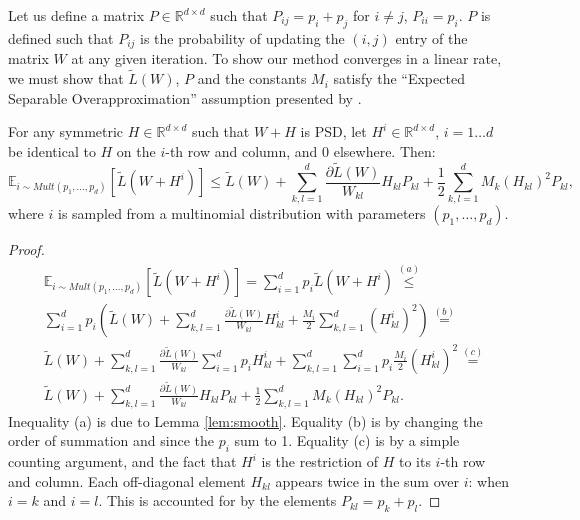 \documentclass[twoside,11pt]{article}
\newcommand\mat[1]{{#1}}
\newcommand{\W}{\mat{W}}
\newcommand{\Hh}{\mat{H}}
\newcommand{\Pp}{\mat{P}}
\newcommand{\R}{\mathbb{R}}
\newcommand{\tL}{\tilde{L}(\W)}
\newcommand{\grdkl}{\frac{\partial \tL}{\W_{kl}}}
\begin{document}
Let us define a matrix $\Pp \in \R^{d \times d}$ such that $\Pp_{ij} = p_i + p_j$ for $i \ne j$, $\Pp_{ii} = p_i$. $\Pp$ is defined such that $\Pp_{ij}$ is the probability of updating the $(i,j)$ entry of the matrix $\W$ at any given iteration. To show our method converges in a linear rate, we must show that $\tL$, $\Pp$ and the constants $M_i$ satisfy the ``Expected Separable Overapproximation'' assumption presented by \citet{richtarik2013optimal}.

\begin{lemma}\label{lem:ESO}
For any symmetric $\Hh \in \R^{d \times d}$ such that $\W + \Hh$ is PSD, let $\Hh^i \in \R^{d \times d}$, $i=1 \ldots d$ be identical to $\Hh$ on the $i$-th row and column, and $0$ elsewhere. Then:
\vspace{-15pt}
\begin{equation}
    \mathbb{E}_{i \sim Mult(p_1, \ldots, p_d)} \left[ \tilde{L}(\W + \Hh^i) \right] \leq 
    \tL + \sum_{k,l=1}^d  \grdkl \Hh_{kl} \Pp_{kl} + \frac{1}{2} \sum_{k,l=1}^d   M_k (\Hh_{kl})^2 \Pp_{kl},
\end{equation}
where $i$ is sampled from a multinomial distribution with parameters $(p_1, \ldots , p_d)$.
\end{lemma}
\begin{proof}%
\vspace{-20pt}
\begin{align*}
    &\mathbb{E}_{i \sim Mult(p_1, \ldots, p_d)} \left[ \tilde{L}(\W + \Hh^i) \right] =\sum_{i=1}^d p_i \tilde{L}(\W + \Hh^i) \stackrel{(a)}{\leq} \\
    & \sum_{i=1}^d p_i \left(\tL + \sum_{k,l=1}^d \grdkl \Hh_{kl}^i + \frac{M_i}{2} \sum_{k,l=1}^d  (\Hh_{kl}^i)^2 \right) \stackrel{(b)}{=} \\
    & \tL + \sum_{k,l=1}^d \grdkl \sum_{i=1}^d  p_i \Hh_{kl}^i + \sum_{k,l=1}^d  \sum_{i=1}^d  p_i \frac{M_i}{2} (\Hh_{kl}^i)^2  \stackrel{(c)}{=} \\
    & \tL + \sum_{k,l=1}^d \grdkl \Hh_{kl} \Pp_{kl} + \frac{1}{2} \sum_{k,l=1}^d M_k (\Hh_{kl})^2 \Pp_{kl}.
\end{align*}
Inequality (a) is due to Lemma \ref{lem:smooth}. Equality (b) is by changing the order of summation and since the $p_i$ sum to 1. Equality (c) is by a simple counting argument, and the fact that $\Hh^i$ is the restriction of $\Hh$ to its $i$-th row and column. Each off-diagonal element $\Hh_{kl}$ appears twice in the sum over $i$: when $i=k$ and $i=l$. This is accounted for by the elements $\Pp_{kl} = p_k + p_l$.
\end{proof}
\end{document}
